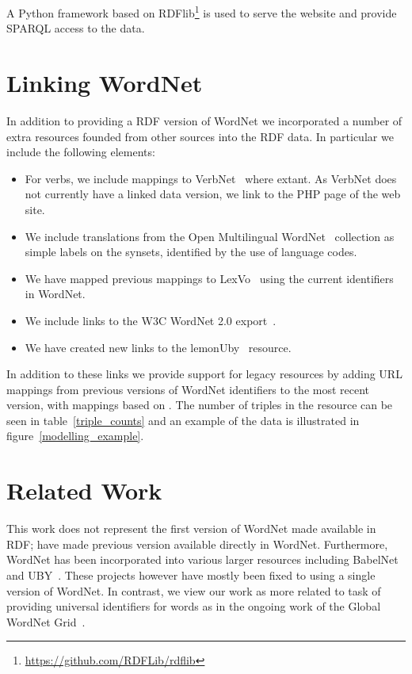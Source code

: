 \documentclass[10pt, a4paper]{article}
\begin{document}
A Python framework based on RDFlib\footnote{\url{https://github.com/RDFLib/rdflib}} is used to serve the website and
provide SPARQL access to the data.

\section{Linking WordNet}

In addition to providing a RDF version of WordNet we incorporated a number
of extra resources founded from other sources into the RDF data. In particular
we include the following elements:

\begin{itemize}
  \item For verbs, we include mappings to VerbNet~\cite{schuler2005verbnet} where extant. As
    VerbNet does not currently have a linked data version, we link to the
    PHP page of the web site.
  \item We include translations from the Open Multilingual WordNet~\cite{bond2013linking}
    collection as simple labels on the synsets, identified by the use of
    language codes.
  \item We have mapped previous mappings to LexVo~\cite{de2008language} 
    using the current identifiers in WordNet.
  \item We include links to the W3C WordNet 2.0 export~\cite{van2006conversion}.
  \item We have created new links to the lemonUby~\cite{eckle2014lemonuby} resource.
\end{itemize}

In addition to these links we provide support for legacy resources by
adding URL mappings from previous versions of WordNet identifiers to the most
recent version, with mappings based on \cite{daude2000mapping}. The number of
triples in the resource can be seen in table~\ref{triple_counts} and an example
of the data is illustrated in figure~\ref{modelling_example}.

\section{Related Work}

This work does not represent the first version of WordNet made available in RDF; 
\cite{van2006conversion,mccrae2012integrating} have made previous
version available directly in WordNet. Furthermore, WordNet has been
incorporated into various larger resources including
BabelNet~\cite{navigli2010babelnet,ehrmann2014} and 
UBY~\cite{gurevych2012uby,eckle2014lemonuby}. These projects however have mostly
been fixed to using a single version of WordNet. In contrast, we view our work
as more related to task of providing universal identifiers for words as in the
ongoing work of the Global WordNet Grid~\cite{pease2008building}.  
\end{document}
